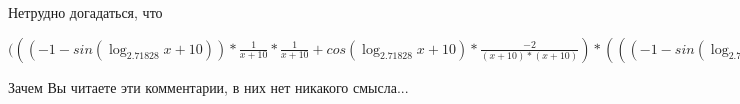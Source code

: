 \documentclass[12pt,a4paper,fleqn]{article}
\theoremstyle{definition}
\begin{document}
Нетрудно догадаться, что

$((( -1  - sin(\log_{ 2.71828 }{ x  +  10 })) * \frac{ 1 }{ x  +  10 }
 * \frac{ 1 }{ x  +  10 }
 + cos(\log_{ 2.71828 }{ x  +  10 }) * \frac{ -2 }{( x  +  10 ) * ( x  +  10 )}
) * ((( -1  - sin(\log_{ 2.71828 }{ x  +  10 })) * \frac{ 1 }{ x  +  10 }
 * \frac{ 1 }{ x  +  10 }
 + cos(\log_{ 2.71828 }{ x  +  10 }) * \frac{ -2 }{( x  +  10 ) * ( x  +  10 )}
) * { 3 }^{sin(\log_{ 2.71828 }{ x  +  10 })} + cos(\log_{ 2.71828 }{ x  +  10 }) * \frac{ 1 }{ x  +  10 }
 * cos(\log_{ 2.71828 }{ x  +  10 }) * \frac{ 1 }{ x  +  10 }
 * { 3 }^{sin(\log_{ 2.71828 }{ x  +  10 })}) = (( -1  - sin(\log_{ 2.71828 }{ x  +  10 })) * \frac{ 1 }{ x  +  10 }
 * \frac{ 1 }{ x  +  10 }
 + cos(\log_{ 2.71828 }{ x  +  10 }) * \frac{ -2 }{( x  +  10 ) * ( x  +  10 )}
) * ((( -1  - sin(\log_{ 2.71828 }{ x  +  10 })) * \frac{ 1 }{ x  +  10 }
 * \frac{ 1 }{ x  +  10 }
 + cos(\log_{ 2.71828 }{ x  +  10 }) * \frac{ -2 }{( x  +  10 ) * ( x  +  10 )}
) * { 3 }^{sin(\log_{ 2.71828 }{ x  +  10 })} + cos(\log_{ 2.71828 }{ x  +  10 }) * \frac{ 1 }{ x  +  10 }
 * cos(\log_{ 2.71828 }{ x  +  10 }) * \frac{ 1 }{ x  +  10 }
 * { 3 }^{sin(\log_{ 2.71828 }{ x  +  10 })})$

Зачем Вы читаете эти комментарии, в них нет никакого смысла...
\end{document}

